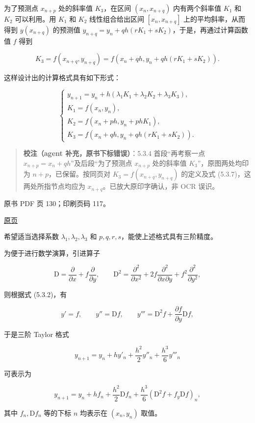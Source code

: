为了预测点 \(x_{n+p}\) 处的斜率值 \(K_3\)，在区间 \((x_n,x_{n+q})\) 内有两个斜率值 \(K_1\) 和 \(K_2\) 可以利用。用 \(K_1\) 和 \(K_2\) 线性组合给出区间 \([x_n,x_{n+q}]\) 上的平均斜率，从而得到 \(y(x_{n+q})\) 的预测值 \(y_{n+q}=y_n+qh(rK_1+sK_2)\)，于是，再通过计算函数值 \(f\) 得到

\[
K_3=f(x_{n+q},y_{n+q})=f(x_n+qh,y_n+qh(rK_1+sK_2)).
\]

这样设计出的计算格式具有如下形式：

\[
\begin{cases}
y_{n+1}=y_n+h(\lambda_1K_1+\lambda_2K_2+\lambda_3K_3),\\
K_1=f(x_n,y_n),\\
K_2=f(x_n+ph,y_n+phK_1),\\
K_3=f(x_n+qh,y_n+qh(rK_1+sK_2)).
\end{cases}\tag{5.3.7}
\]

\begin{quote}
\textbf{校注（agent 补充，原书下标错误）}：5.3.4 首段``再考察一点 \(x_{n+p}=x_n+qh\)''及后段``为了预测点 \(x_{n+p}\) 处的斜率值 \(K_3\)''，原图两处均印为 \(n+p\)，已保留。按同页对 \(K_3=f(x_{n+q},y_{n+q})\) 的定义及式 (5.3.7)，这两处所指节点均应为 \(x_{n+q}\)。已放大原印字确认，非 OCR 误识。
\end{quote}

\clearpage

原书 PDF 页 130；印刷页码 117。

\href{source-images/pdf-130.jpeg}{原页}

希望适当选择系数 \(\lambda_1,\lambda_2,\lambda_3\) 和 \(p,q,r,s\)，能使上述格式具有三阶精度。

为便于进行数学演算，引进算子

\[
\mathrm D=\frac{\partial}{\partial x}+f\frac{\partial}{\partial y},\qquad
\mathrm D^2=\frac{\partial^2}{\partial x^2}+2f\frac{\partial^2}{\partial x\partial y}+f^2\frac{\partial^2}{\partial y^2},
\]

则根据式 (5.3.2)，有

\[
y'=f,\qquad y''=\mathrm Df,\qquad y'''=\mathrm D^2f+\frac{\partial f}{\partial y}\mathrm Df,
\]

于是三阶 Taylor 格式

\[
y_{n+1}=y_n+hy'_n+\frac{h^2}{2}y''_n+\frac{h^3}{6}y'''_n
\]

可表示为

\[
y_{n+1}=y_n+hf_n+\frac{h^2}{2}\mathrm Df_n+\frac{h^3}{6}(\mathrm D^2f+f_y\mathrm Df)_n,\tag{5.3.8}
\]

其中 \(f_n,\mathrm Df_n\) 等的下标 \(n\) 均表示在 \((x_n,y_n)\) 取值。

